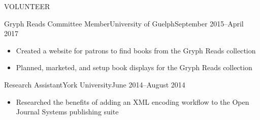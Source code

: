 \documentclass[]{mcdowellcv}
\begin{document}
	
	\begin{cvsection}{VOLUNTEER}

        \begin{cvsubsection}{Gryph Reads Committee Member}{University of Guelph}{September 2015--April 2017}
			\begin{itemize}
				\item Created a website for patrons to find books from the Gryph Reads collection
				\item Planned, marketed, and setup book displays for the Gryph Reads collection
			\end{itemize}
		\end{cvsubsection}


        \begin{cvsubsection}{Research Assistant}{York University}{June 2014--August 2014}
			\begin{itemize}
				\item Researched the benefits of adding an XML encoding workflow to the Open Journal Systems publishing suite
			\end{itemize}
		\end{cvsubsection}
	\end{cvsection}
	
\end{document}
